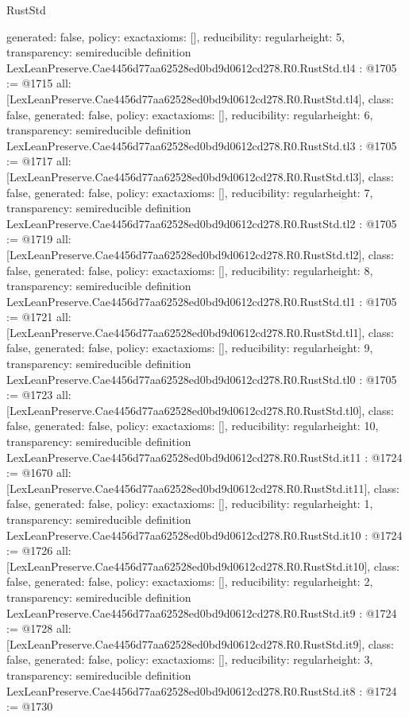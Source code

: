 \begin{lexlean}{RustStd}
\begin{coremodule}
{  generated: false,
  policy: exact{axioms: []},
  reducibility: regular{height: 5},
  transparency: semireducible
}
definition LexLeanPreserve.Cae4456d77aa62528ed0bd9d0612cd278.R0.RustStd.tl4 : @1705 := @1715 {
  all: [LexLeanPreserve.Cae4456d77aa62528ed0bd9d0612cd278.R0.RustStd.tl4],
  class: false,
  generated: false,
  policy: exact{axioms: []},
  reducibility: regular{height: 6},
  transparency: semireducible
}
definition LexLeanPreserve.Cae4456d77aa62528ed0bd9d0612cd278.R0.RustStd.tl3 : @1705 := @1717 {
  all: [LexLeanPreserve.Cae4456d77aa62528ed0bd9d0612cd278.R0.RustStd.tl3],
  class: false,
  generated: false,
  policy: exact{axioms: []},
  reducibility: regular{height: 7},
  transparency: semireducible
}
definition LexLeanPreserve.Cae4456d77aa62528ed0bd9d0612cd278.R0.RustStd.tl2 : @1705 := @1719 {
  all: [LexLeanPreserve.Cae4456d77aa62528ed0bd9d0612cd278.R0.RustStd.tl2],
  class: false,
  generated: false,
  policy: exact{axioms: []},
  reducibility: regular{height: 8},
  transparency: semireducible
}
definition LexLeanPreserve.Cae4456d77aa62528ed0bd9d0612cd278.R0.RustStd.tl1 : @1705 := @1721 {
  all: [LexLeanPreserve.Cae4456d77aa62528ed0bd9d0612cd278.R0.RustStd.tl1],
  class: false,
  generated: false,
  policy: exact{axioms: []},
  reducibility: regular{height: 9},
  transparency: semireducible
}
definition LexLeanPreserve.Cae4456d77aa62528ed0bd9d0612cd278.R0.RustStd.tl0 : @1705 := @1723 {
  all: [LexLeanPreserve.Cae4456d77aa62528ed0bd9d0612cd278.R0.RustStd.tl0],
  class: false,
  generated: false,
  policy: exact{axioms: []},
  reducibility: regular{height: 10},
  transparency: semireducible
}
definition LexLeanPreserve.Cae4456d77aa62528ed0bd9d0612cd278.R0.RustStd.it11 : @1724 := @1670 {
  all: [LexLeanPreserve.Cae4456d77aa62528ed0bd9d0612cd278.R0.RustStd.it11],
  class: false,
  generated: false,
  policy: exact{axioms: []},
  reducibility: regular{height: 1},
  transparency: semireducible
}
definition LexLeanPreserve.Cae4456d77aa62528ed0bd9d0612cd278.R0.RustStd.it10 : @1724 := @1726 {
  all: [LexLeanPreserve.Cae4456d77aa62528ed0bd9d0612cd278.R0.RustStd.it10],
  class: false,
  generated: false,
  policy: exact{axioms: []},
  reducibility: regular{height: 2},
  transparency: semireducible
}
definition LexLeanPreserve.Cae4456d77aa62528ed0bd9d0612cd278.R0.RustStd.it9 : @1724 := @1728 {
  all: [LexLeanPreserve.Cae4456d77aa62528ed0bd9d0612cd278.R0.RustStd.it9],
  class: false,
  generated: false,
  policy: exact{axioms: []},
  reducibility: regular{height: 3},
  transparency: semireducible
}
definition LexLeanPreserve.Cae4456d77aa62528ed0bd9d0612cd278.R0.RustStd.it8 : @1724 := @1730 {
}
\end{coremodule}
\end{lexlean}
